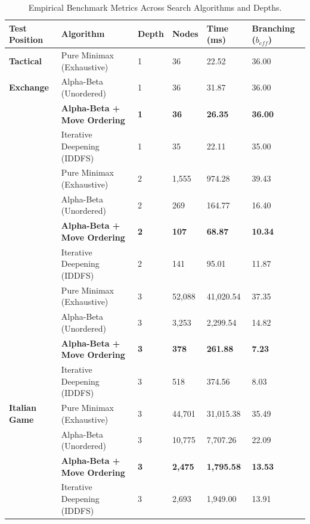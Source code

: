 \documentclass[11pt,a4paper]{article}
\begin{document}
\begin{table}[H]
\centering
\caption{Empirical Benchmark Metrics Across Search Algorithms and Depths.}
\label{tab:benchmark_results}
\small
\renewcommand{\arraystretch}{1.2}
\begin{tabularx}{\textwidth}{@{} L{2.5cm} Y C{0.9cm} R{1.6cm} R{1.6cm} R{1.6cm} @{}}
\toprule
\textbf{Test Position} & \textbf{Algorithm} & \textbf{Depth} & \textbf{Nodes} & \textbf{Time (ms)} & \textbf{Branching ($b_{eff}$)} \\
\midrule
\textbf{Tactical} & Pure Minimax (Exhaustive) & 1 & 36 & 22.52 & 36.00 \\
\textbf{Exchange} & Alpha-Beta (Unordered) & 1 & 36 & 31.87 & 36.00 \\
& \textbf{Alpha-Beta + Move Ordering} & \textbf{1} & \textbf{36} & \textbf{26.35} & \textbf{36.00} \\
& Iterative Deepening (IDDFS) & 1 & 35 & 22.11 & 35.00 \\
& Pure Minimax (Exhaustive) & 2 & 1,555 & 974.28 & 39.43 \\
& Alpha-Beta (Unordered) & 2 & 269 & 164.77 & 16.40 \\
& \textbf{Alpha-Beta + Move Ordering} & \textbf{2} & \textbf{107} & \textbf{68.87} & \textbf{10.34} \\
& Iterative Deepening (IDDFS) & 2 & 141 & 95.01 & 11.87 \\
& Pure Minimax (Exhaustive) & 3 & 52,088 & 41,020.54 & 37.35 \\
& Alpha-Beta (Unordered) & 3 & 3,253 & 2,299.54 & 14.82 \\
& \textbf{Alpha-Beta + Move Ordering} & \textbf{3} & \textbf{378} & \textbf{261.88} & \textbf{7.23} \\
& Iterative Deepening (IDDFS) & 3 & 518 & 374.56 & 8.03 \\
\midrule
\textbf{Italian Game} & Pure Minimax (Exhaustive) & 3 & 44,701 & 31,015.38 & 35.49 \\
& Alpha-Beta (Unordered) & 3 & 10,775 & 7,707.26 & 22.09 \\
& \textbf{Alpha-Beta + Move Ordering} & \textbf{3} & \textbf{2,475} & \textbf{1,795.58} & \textbf{13.53} \\
& Iterative Deepening (IDDFS) & 3 & 2,693 & 1,949.00 & 13.91 \\
\bottomrule
\end{tabularx}
\end{table}
\end{document}
